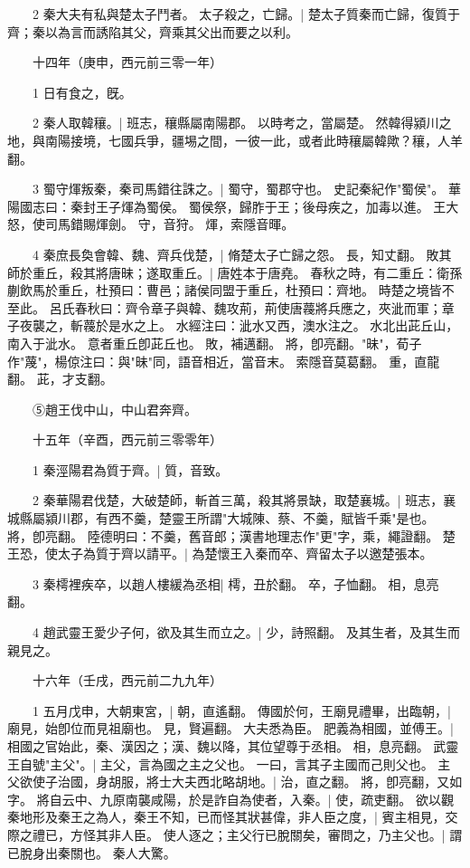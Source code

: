 　　2 秦大夫有私與楚太子鬥者。
	太子殺之，亡歸。|{
	楚太子質秦而亡歸，復質于齊；秦以為言而誘陷其父，齊乘其父出而要之以利。
}

　　十四年（庚申，西元前三零一年）

　　1 日有食之，旣。


　　2 秦人取韓穰。|{
	班志，穰縣屬南陽郡。
	以時考之，當屬楚。
	然韓得潁川之地，與南陽接境，七國兵爭，疆埸之間，一彼一此，或者此時穰屬韓歟？穰，人羊翻。
}

　　3 蜀守煇叛秦，秦司馬錯往誅之。|{
	蜀守，蜀郡守也。
	史記秦紀作"蜀侯"。
	華陽國志曰：秦封王子煇為蜀侯。
	蜀侯祭，歸胙于王；後母疾之，加毒以進。
	王大怒，使司馬錯賜煇劍。
	守，音狩。
	煇，索隱音暉。
}

　　4 秦庶長奐會韓、魏、齊兵伐楚，|{
	脩楚太子亡歸之怨。
	長，知丈翻。
}
敗其師於重丘，殺其將唐昧；遂取重丘。|{
	唐姓本于唐堯。
	春秋之時，有二重丘：衛孫蒯飲馬於重丘，杜預曰：曹邑；諸侯同盟于重丘，杜預曰：齊地。
	時楚之境皆不至此。
	呂氏春秋曰：齊令章子與韓、魏攻荊，荊使唐薎將兵應之，夾泚而軍；章子夜襲之，斬薎於是水之上。
	水經注曰：泚水又西，澳水注之。
	水北出茈丘山，南入于泚水。
	意者重丘卽茈丘也。
	敗，補邁翻。
	將，卽亮翻。"昧"，荀子作"蔑"，楊倞注曰：與"昧"同，語音相近，當音末。
	索隱音莫葛翻。
	重，直龍翻。
	茈，才支翻。
}

　　⑤趙王伐中山，中山君奔齊。


　　十五年（辛酉，西元前三零零年）

　　1 秦涇陽君為質于齊。|{
	質，音致。
}

　　2 秦華陽君伐楚，大破楚師，斬首三萬，殺其將景缺，取楚襄城。|{
	班志，襄城縣屬潁川郡，有西不羹，楚靈王所謂"大城陳、蔡、不羹，賦皆千乘"是也。
	將，卽亮翻。
	陸德明曰：不羹，舊音郎；漢書地理志作"更"字，乘，繩證翻。
}
楚王恐，使太子為質于齊以請平。|{
	為楚懷王入秦而卒、齊留太子以邀楚張本。
}

　　3 秦樗裡疾卒，以趙人樓緩為丞相|{
	樗，丑於翻。
	卒，子恤翻。
	相，息亮翻。
}

　　4 趙武靈王愛少子何，欲及其生而立之。|{
	少，詩照翻。
	及其生者，及其生而親見之。
}

　　十六年（壬戌，西元前二九九年）

　　1 五月戊申，大朝東宮，|{
	朝，直遙翻。
}
傳國於何，王廟見禮畢，出臨朝，|{
	廟見，始卽位而見祖廟也。
	見，賢遍翻。
}
大夫悉為臣。
	肥義為相國，並傅王。|{
	相國之官始此，秦、漢因之；漢、魏以降，其位望尊于丞相。
	相，息亮翻。
}
武靈王自號"主父"。|{
	主父，言為國之主之父也。
	一曰，言其子主國而己則父也。
}
主父欲使子治國，身胡服，將士大夫西北略胡地。|{
	治，直之翻。
	將，卽亮翻，又如字。
}
將自云中、九原南襲咸陽，於是詐自為使者，入秦。|{
	使，疏吏翻。
}
欲以觀秦地形及秦王之為人，秦王不知，已而怪其狀甚偉，非人臣之度，|{
	賓主相見，交際之禮已，方怪其非人臣。
}
使人逐之；主父行已脫關矣，審問之，乃主父也。|{
	謂已脫身出秦關也。
}
秦人大驚。


